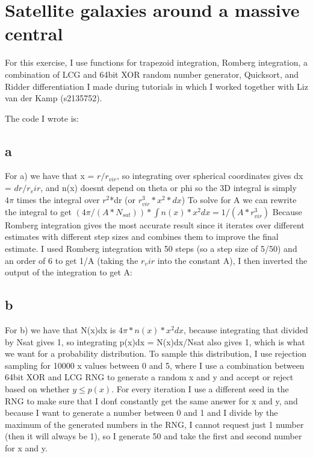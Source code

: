 \section{Satellite galaxies around a massive central}

For this exercise, I use functions for trapezoid integration, Romberg integration, a combination of 
LCG and 64bit XOR random number generator, Quicksort, and Ridder differentiation I made during tutorials in 
which I worked together with Liz van der Kamp (s2135752).


The code I wrote is:


\subsection*{a}

For a) we have that x = $r/r_{vir}$, so integrating over spherical coordinates gives dx = $dr/r_vir$, 
and n(x) doesnt depend on theta or phi so the 3D integral is simply $4\pi$ times the integral over 
$r^2$*dr (or $r_{vir}^3*x^2*dx$)
To solve for A we can rewrite the integral to get $(4\pi/(A*N_{sat}))*\int n(x)*x^2 dx = 1/(A*r_{vir}^3)$
Because Romberg integration gives the most accurate result since it iterates over different estimates with different step sizes and combines them to improve the final estimate. I used Romberg integration with 50 steps 
(so a step size of 5/50) and an order of 6 to get 1/A (taking the $r_vir$ into the constant A),
I then inverted the output of the integration to get A:


\subsection*{b}

For b) we have that N(x)dx is $4\pi*n(x)*x^2 dx$, because integrating that divided by Nsat gives 1, 
so integrating p(x)dx = N(x)dx/Nsat also gives 1, which is what we want for a probability distribution.
To sample this distribution, I use rejection sampling for 10000 x values between 0 and 5,
where I use a combination between 64bit XOR and LCG RNG to generate a random x and y and accept or reject
based on whether $y \leq p(x)$. For every iteration I use a different seed in the RNG to make sure that I 
don\'t constantly get the same answer for x and y, and because I want to generate a number between 0 and 1 
and I divide by the maximum of the generated numbers in the RNG, I cannot request just 1 number 
(then it will always be 1), so I generate 50 and take the first and second number for x and y.

